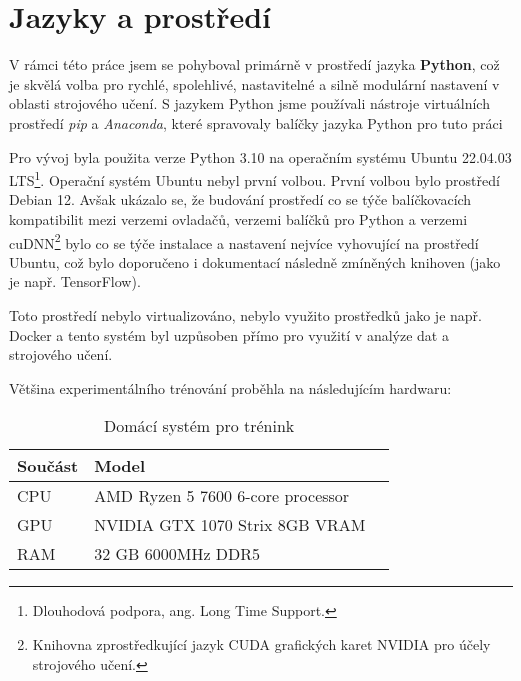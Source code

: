 \section{Jazyky a prostředí}
\label{sec:Chapter51}
V rámci této práce jsem se pohyboval primárně v prostředí jazyka \textbf{Python}, což je skvělá volba pro rychlé, spolehlivé, nastavitelné a silně modulární nastavení v oblasti strojového učení. S jazykem Python jsme používali nástroje virtuálních prostředí \textit{pip} a \textit{Anaconda}, které spravovaly balíčky jazyka Python pro tuto práci

Pro vývoj byla použita verze Python 3.10 na operačním systému Ubuntu 22.04.03 LTS\footnote{Dlouhodová podpora, ang. Long Time Support.}. Operační systém Ubuntu nebyl první volbou. První volbou bylo prostředí Debian 12. Avšak ukázalo se, že budování prostředí co se týče balíčkovacích kompatibilit mezi verzemi ovladačů, verzemi balíčků pro Python a verzemi cuDNN\footnote{Knihovna zprostředkující jazyk CUDA grafických karet NVIDIA pro účely strojového učení.} bylo co se týče instalace a nastavení nejvíce vyhovující na prostředí Ubuntu, což bylo doporučeno i dokumentací následně zmíněných knihoven (jako je např. TensorFlow).

Toto prostředí nebylo virtualizováno, nebylo využito prostředků jako je např. Docker a tento systém byl uzpůsoben přímo pro využití v analýze dat a strojového učení.

Většina experimentálního trénování proběhla na následujícím hardwaru:

\begin{table}[ht]
\centering
\begin{tabular}{@{}lll@{}}
\toprule
Součást & Model \\
\midrule
CPU & AMD Ryzen 5 7600 6-core processor \\
GPU & NVIDIA GTX 1070 Strix 8GB VRAM  \\
RAM & 32 GB 6000MHz DDR5 \\
\bottomrule
\end{tabular}
\caption{Domácí systém pro trénink}
\label{fig:wortelus_pc}
\end{table}
\endinput